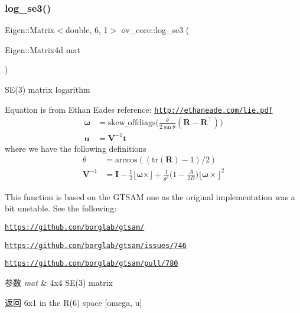 \subsubsection{\texorpdfstring{log\+\_\+se3()}{log\_se3()}}
{\footnotesize\ttfamily Eigen\+::\+Matrix$<$double, 6, 1$>$ ov\+\_\+core\+::log\+\_\+se3 (\begin{DoxyParamCaption}\item[{Eigen\+::\+Matrix4d}]{mat }\end{DoxyParamCaption})\hspace{0.3cm}{\ttfamily [inline]}}



S\+E(3) matrix logarithm 

Equation is from Ethan Eade\textquotesingle{}s reference\+: \href{http://ethaneade.com/lie.pdf}{\tt http\+://ethaneade.\+com/lie.\+pdf} \begin{align*} \boldsymbol\omega &=\mathrm{skew\_offdiags}\Big(\frac{\theta}{2\sin\theta}(\mathbf R - \mathbf R^\top)\Big) \\ \mathbf u &= \mathbf V^{-1}\mathbf t \end{align*} where we have the following definitions \begin{align*} \theta &= \mathrm{arccos}((\mathrm{tr}(\mathbf R)-1)/2) \\ \mathbf V^{-1} &= \mathbf I - \frac{1}{2} \lfloor \boldsymbol\omega \times\rfloor + \frac{1}{\theta^2}\Big(1-\frac{A}{2B}\Big)\lfloor \boldsymbol\omega \times\rfloor^2 \end{align*}

This function is based on the G\+T\+S\+AM one as the original implementation was a bit unstable. See the following\+:
\begin{DoxyItemize}
\item \href{https://github.com/borglab/gtsam/}{\tt https\+://github.\+com/borglab/gtsam/}
\item \href{https://github.com/borglab/gtsam/issues/746}{\tt https\+://github.\+com/borglab/gtsam/issues/746}
\item \href{https://github.com/borglab/gtsam/pull/780}{\tt https\+://github.\+com/borglab/gtsam/pull/780}
\end{DoxyItemize}


\begin{DoxyParams}{参数}
{\em mat} & 4x4 S\+E(3) matrix \\
\hline
\end{DoxyParams}
\begin{DoxyReturn}{返回}
6x1 in the R(6) space \mbox{[}omega, u\mbox{]} 
\end{DoxyReturn}
\mbox{\label{namespaceov__core_a1bbbcb3ed59aa7dff7883c2e8644d9fb}} 

